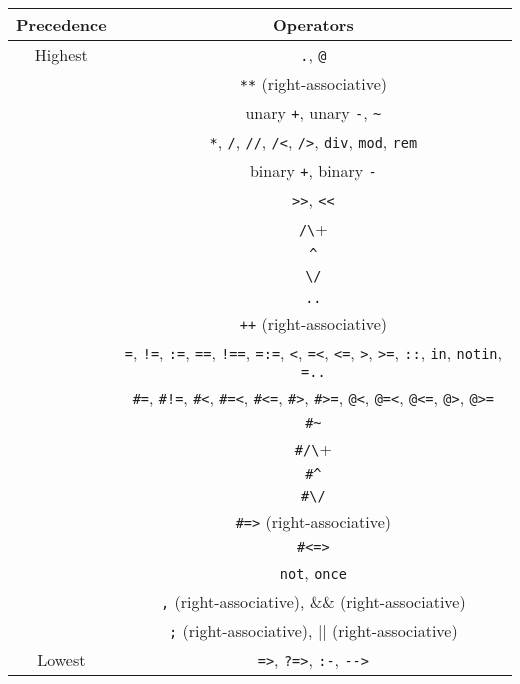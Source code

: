 \begin{center}
\begin{tabular}{ |c|c| } \hline
Precedence & Operators  \\ \hline \hline
Highest    & \verb+.+, \verb+@+ \\ \hline
           & \verb+**+ (right-associative) \\ \hline
           & unary \verb-+-, unary \verb+-+, \verb+~+  \\ \hline 
           & \verb+*+, \verb+/+, \verb+//+, \verb+/<+, \verb+/>+, \verb+div+, \verb+mod+, \verb+rem+ \\ \hline 
           & binary \verb-+-, binary \verb+-+ \\ \hline 
           & \verb+>>+, \verb+<<+ \\ \hline 
           & \verb+/\+ \\ \hline 
           & \verb+^+ \\ \hline 
           & \verb+\/+ \\ \hline 
           & \verb+..+ \\ \hline 
           & \verb-++- (right-associative) \\ \hline 
           & \verb+=+, \verb+!=+,  \verb+:=+,  \verb+==+, \verb+!==+, \verb+=:=+, \verb+<+,  \verb+=<+, \verb+<=+, \verb+>+,  \verb+>=+, \verb+::+, \verb+in+, \verb+notin+, \verb+=..+  \\ 
           &  \verb+#=+,  \verb+#!=+, \verb+#<+,  \verb+#=<+, \verb+#<=+, \verb+#>+, \verb+#>=+, \verb+@<+, \verb+@=<+, \verb+@<=+, \verb+@>+, \verb+@>=+  \\ \hline 
           & \verb+#~+ \\ \hline 
           & \verb+#/\+ \\ \hline 
           & \verb+#^+ \\ \hline 
           & \verb+#\/+ \\ \hline 
           & \verb+#=>+ (right-associative)\\ \hline 
           & \verb+#<=>+ \\ \hline 
           & \verb+not+, \verb+once+  \\ \hline 
           & \verb+,+ (right-associative), $\&\&$ (right-associative) \\ \hline 
           & \verb+;+ (right-associative), $|$$|$ (right-associative) \\ \hline
Lowest     & \verb+=>+, \verb+?=>+, \verb+:-+, \verb+-->+ \\ \hline
\end{tabular}
\end{center}

